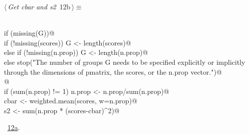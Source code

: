 \documentclass[reqno]{amsart}
\renewcommand{\NWtarget}[2]{\hypertarget{#1}{#2}}
\renewcommand{\NWlink}[2]{\hyperlink{#1}{#2}}
\begin{document}
\begin{flushleft} \small\label{scrap19}\raggedright\small
\NWtarget{nuweb12b}{} $\langle\,${\itshape Get cbar and s2}\nobreak\ {\footnotesize {12b}}$\,\rangle\equiv$
\vspace{-1ex}
\begin{list}{}{} \item
\mbox{}\verb@@\\
\mbox{}\verb@    if (missing(G)){@\\
\mbox{}\verb@      if (!missing(scores)) G <- length(scores)@\\
\mbox{}\verb@      else if (!missing(n.prop)) G <- length(n.prop)@\\
\mbox{}\verb@      else stop("The number of groups G needs to be specified explicitly or implicitly through the dimensions of pmatrix, the scores, or the n.prop vector.")@\\
\mbox{}\verb@    }@\\
\mbox{}\verb@    if (sum(n.prop) != 1) n.prop <- n.prop/sum(n.prop)@\\
\mbox{}\verb@    cbar <- weighted.mean(scores, w=n.prop)@\\
\mbox{}\verb@    s2 <- sum(n.prop * (scores-cbar)^2)@\\
\mbox{}\verb@@{\NWsep}
\end{list}
\vspace{-1.5ex}
\footnotesize
\begin{list}{}{\setlength{\itemsep}{-\parsep}\setlength{\itemindent}{-\leftmargin}}
\item \NWtxtMacroRefIn\ \NWlink{nuweb12a}{12a}.

\item{}
\end{list}
\vspace{4ex}
\end{flushleft}
\end{document}
